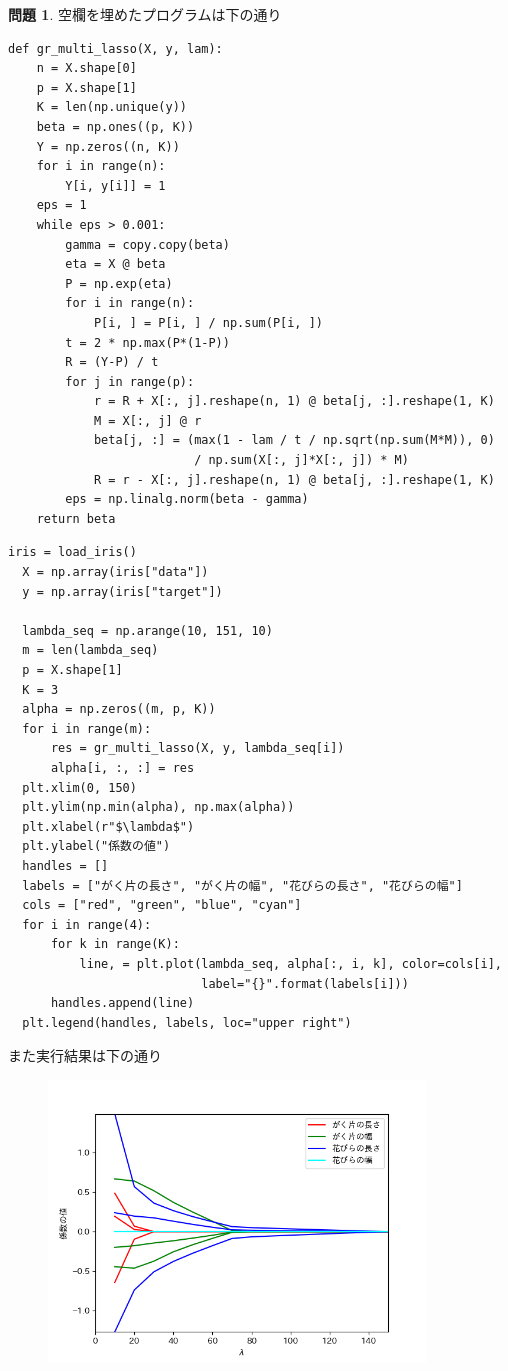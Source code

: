 \documentclass[titlepage]{jsarticle}
\theoremstyle{definition}
\newtheorem{Ex}{問題}
\theoremstyle{mystyle} %
\renewcommand{\footnotesize}{\normalsize}
\begin{document}
\begin{Ex}
  空欄を埋めたプログラムは下の通り
  \begin{lstlisting}[basicstyle = \ttfamily\footnotesize, frame = single]
  def gr_multi_lasso(X, y, lam):
    n = X.shape[0]
    p = X.shape[1]
    K = len(np.unique(y))
    beta = np.ones((p, K))
    Y = np.zeros((n, K))
    for i in range(n):
        Y[i, y[i]] = 1
    eps = 1
    while eps > 0.001:
        gamma = copy.copy(beta)
        eta = X @ beta
        P = np.exp(eta)
        for i in range(n):
            P[i, ] = P[i, ] / np.sum(P[i, ])
        t = 2 * np.max(P*(1-P))
        R = (Y-P) / t
        for j in range(p):
            r = R + X[:, j].reshape(n, 1) @ beta[j, :].reshape(1, K)
            M = X[:, j] @ r
            beta[j, :] = (max(1 - lam / t / np.sqrt(np.sum(M*M)), 0)
                          / np.sum(X[:, j]*X[:, j]) * M)
            R = r - X[:, j].reshape(n, 1) @ beta[j, :].reshape(1, K)
        eps = np.linalg.norm(beta - gamma)
    return beta
\end{lstlisting}


\begin{lstlisting}[basicstyle = \ttfamily\footnotesize, frame = single]
  iris = load_iris()
  X = np.array(iris["data"])
  y = np.array(iris["target"])
  
  lambda_seq = np.arange(10, 151, 10)
  m = len(lambda_seq)
  p = X.shape[1]
  K = 3
  alpha = np.zeros((m, p, K))
  for i in range(m):
      res = gr_multi_lasso(X, y, lambda_seq[i])
      alpha[i, :, :] = res
  plt.xlim(0, 150)
  plt.ylim(np.min(alpha), np.max(alpha))
  plt.xlabel(r"$\lambda$")
  plt.ylabel("係数の値")
  handles = []
  labels = ["がく片の長さ", "がく片の幅", "花びらの長さ", "花びらの幅"]
  cols = ["red", "green", "blue", "cyan"]
  for i in range(4):
      for k in range(K):
          line, = plt.plot(lambda_seq, alpha[:, i, k], color=cols[i],
                           label="{}".format(labels[i]))
      handles.append(line)
  plt.legend(handles, labels, loc="upper right")
\end{lstlisting}
また実行結果は下の通り
\begin{figure}[H]
\includegraphics[width=10cm]{iris.png}
 \end{figure}
\end{Ex}
\end{document}
